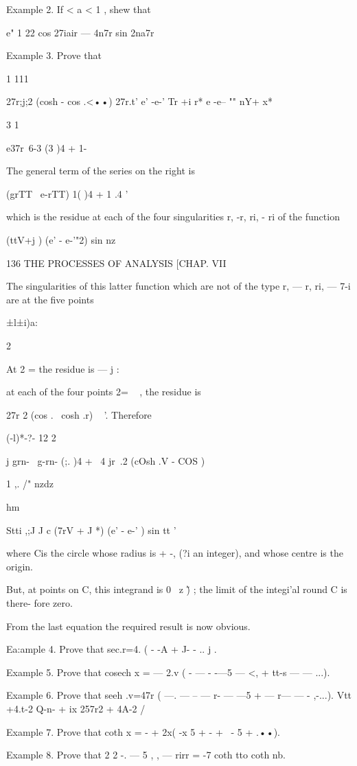 Example 2. If < a < 1 , shew that

e" 1 22 cos 27iair — 4n7r sin 2na7r

Example 3. Prove that

1 111

27r;j;2 (cosh - cos .<••) 27r.t' e' -e-' Tr +i r* e -e-- "" nY+ x*

3 1

e37r\ 6-3 (3 )4 + 1-

The general term of the series on the right is

(grTT \ e-rTT) 1( )4 + 1 .4 '

which is the residue at each of the four singularities r, -r, ri, - ri
of the function

(ttV+j ) (e' - e-'"2) sin nz

136 THE PROCESSES OF ANALYSIS [CHAP. VII

The singularities of this latter function which are not of the type r,
— r, ri, — 7-i are at the five points

 ±l±i)a:

2

At 2 = the residue is — j :

at each of the four points 2= ~ , the residue is

 27r 2 (cos . \ cosh .r) ~ '. Therefore

  (-l)*-?- 12 2

 j grn- \ g-rn- (;. )4 + \ 4 jr\ .2 (cOsh .V - COS )

1 ,. /" nzdz

hm

Stti ,;J J c (7rV + J *) (e' - e-' ) sin tt '

where Cis the circle whose radius is + -, (?i an integer), and whose
centre is the origin.

But, at points on C, this integrand is 0 \ z \~ ) ; the limit of the
integi'al round C is there- fore zero.

From the last equation the required result is now obvious.

Ea:ample 4. Prove that sec.r=4. ( - -A + J- - .. j .

Example 5. Prove that cosech x = — 2.v ( - — - -—5 — <, + tt-s — —
...).

Example 6. Prove that seeh .v=47r ( —. — -- — r- — —5 + — r— — -
,-...). Vtt +4.t-2 Q-n- + ix 257r2 + 4A-2 /

Example 7. Prove that coth x = - + 2x( -x 5 + - + \ - 5 + .••).

Example 8. Prove that 2 2 -. — 5 , , — rirr = -7 coth tto coth nb.


